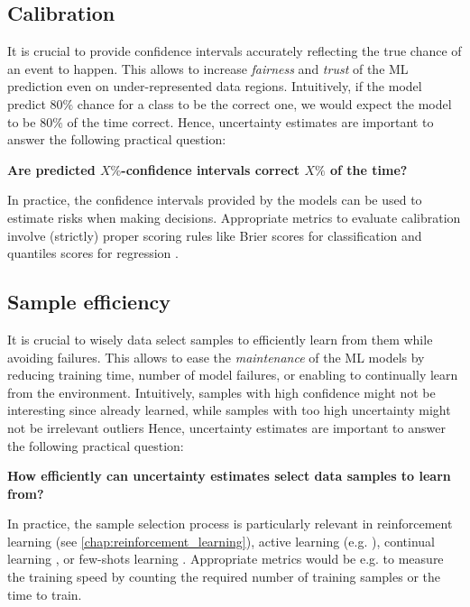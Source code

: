 \subsection{Calibration}
\label{sec:calibration}

It is crucial to provide confidence intervals accurately reflecting the true chance of an event to happen. This allows to increase \emph{fairness} and \emph{trust} of the ML prediction even on under-represented data regions. Intuitively, if the model predict $80\%$ chance for a class to be the correct one, we would expect the model to be $80\%$ of the time correct. Hence, uncertainty estimates are important to answer the following practical question:

\begin{center}
    \textbf{Are predicted $X\%$-confidence intervals correct $X\%$ of the time?}
\end{center}

In practice, the confidence intervals provided by the models can be used to estimate risks when making decisions. Appropriate metrics to evaluate calibration involve (strictly) proper scoring rules like Brier scores for classification and quantiles scores for regression \cite{scoring-rules}.

\subsection{Sample efficiency}

It is crucial to wisely data select samples to efficiently learn from them while avoiding failures. This allows to ease the \emph{maintenance} of the ML models by reducing training time, number of model failures, or enabling to continually learn from the environment. Intuitively, samples with high confidence might not be interesting since already learned, while samples with too high uncertainty might not be irrelevant outliers Hence, uncertainty estimates are important to answer the following practical question:

\begin{center}
    \textbf{How efficiently can uncertainty estimates select data samples to learn from?}
\end{center}

In practice, the sample selection process is particularly relevant in reinforcement learning (see \cref{chap:reinforcement_learning}), active learning (e.g. \cite{gal2017bald, kirsch2019batch}), continual learning \cite{hsu2018continual, lin2021clear}, or few-shots learning \cite{antoniou2020fewshots}. Appropriate metrics would be e.g. to measure the training speed by counting the required number of training samples or the time to train.